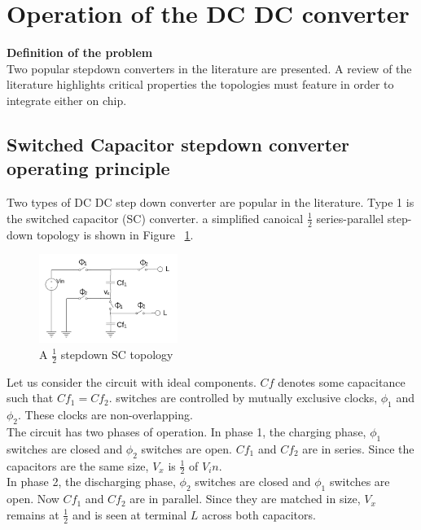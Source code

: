 \documentclass[letterpaper,twocolumn,10pt]{article}
\begin{document}

\section{Operation of the DC DC converter}

\textbf{Definition of the problem}\\
Two popular stepdown converters in the literature are presented. A review of the literature highlights critical properties the topologies must feature in order to integrate either on chip.

\subsection{Switched Capacitor stepdown converter operating principle}
Two types of DC DC step down converter are popular in the literature. Type 1 is the switched capacitor (SC) converter. a simplified canoical $\frac{1}{2}$ series-parallel step-down topology is shown in Figure ~\ref{SCTopology}.\\


\begin{figure}[here]
\includegraphics[width=0.4\textwidth]{SCTopology}
\caption{A $\frac{1}{2}$ stepdown SC topology}
\label{SCTopology}
\end{figure}

Let us consider the circuit with ideal components. $Cf$ denotes some capacitance such that $Cf_1 = Cf_2$. switches are controlled by mutually exclusive clocks, $\phi_1$ and $\phi_2$. These clocks are non-overlapping.\\
The circuit has two phases of operation. In phase 1, the charging phase, $\phi_1$ switches are closed and $\phi_2$ switches are open. $Cf_1$ and $Cf_2$ are in series. Since the capacitors are the same size, $V_x$ is $\frac{1}{2}$ of $V_in$.\\
In phase 2, the discharging phase, $\phi_2$ switches are closed and $\phi_1$ switches are open. Now $Cf_1$ and $Cf_2$ are in parallel. Since they are matched in size, $V_x$ remains at $\frac{1}{2}$ and is seen at terminal $L$ across both capacitors.\\
\end{document}
